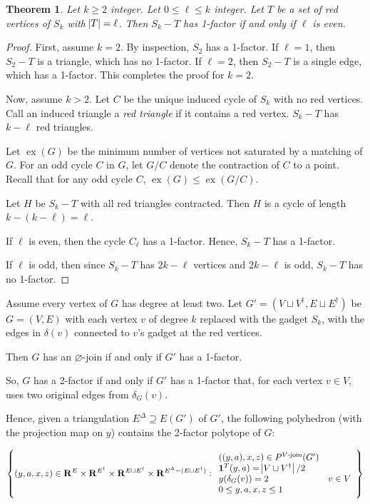 \documentclass{article}
\newtheorem{theorem}{Theorem}
\DeclareMathOperator{\ex}{ex}
\begin{document}
	\begin{theorem}
		Let $k\geq 2$ integer. Let $0\leq \ell \leq k$ integer.
		Let $T$ be a set of red vertices of $S_k$ with $\abs{T} =\ell$.
		Then $S_k - T$ has 1-factor if and only if $\ell$ is even.
	\end{theorem}

	\begin{proof}
		First, assume $k=2$. By inspection, $S_2$ has a 1-factor. If 
		$\ell=1$, then $S_2 - T$ is a triangle, which has no 1-factor.
		If $\ell=2$, then $S_2 - T$ is a single edge, which has a 1-factor.
		This completes the proof for $k=2$.

		Now, assume $k>2$. Let $C$ be the unique induced cycle of $S_k$
		with no red vertices. Call an induced triangle a \emph{red triangle}
		if it contains a red vertex. $S_k - T$ has $k-\ell$ red triangles.
		
		Let $\ex(G)$ be the minimum number of vertices not saturated
		by a matching of $G$.
		For an odd cycle $C$ in $G$, let $G/C$ denote the contraction of $C$
		to a point.  
		Recall that for any odd cycle $C$, $\ex(G) \leq \ex(G/C)$.

		Let $H$ be $S_k - T$ with all red triangles contracted.
		Then $H$ is a cycle of length $k - (k-\ell) = \ell$.

		If $\ell$ is even, then the cycle $C_\ell$ has a 1-factor.
		Hence, $S_k - T$ has a 1-factor. 

		If $\ell$ is odd, then since $S_k - T$ has $2k - \ell$ vertices
		and $2k-\ell$ is odd, $S_k - T$ has no 1-factor.
	\end{proof}


	Assume every vertex of $G$ has degree at least two.
	Let $G' = (V\sqcup V^\dagger, E\sqcup E^\dagger)$ be $G=(V,E)$
	with each vertex $v$ of degree $k$ replaced with the gadget $S_k$,
	with the edges in $\delta(v)$ connected to $v$'s gadget at the red vertices.


	Then $G$ has an $\varnothing$-join if and only if $G'$ has a 1-factor.
	
	So, $G$ has a 2-factor if and only if $G'$ has a 1-factor that,
	for each vertex $v\in V$,
	uses two original edges from $\delta_G(v)$.

	
	Hence, given a triangulation $E^\Delta\supseteq E(G')$ of $G'$,
	the following polyhedron (with the projection map
	on $y$) contains the 2-factor polytope  of $G$:

	$$\cbr{(y,a,x,z)\in \mathbf{R}^{E}\times\mathbf{R}^{E^\dagger} \times \mathbf{R}^{E \sqcup E^\dagger} \times \mathbf{R}^{E^\Delta - (E\sqcup E^\dagger)} : \begin{array}{ll}
		((y,a),x,z) \in P^{\text{$V$-join}}(G') \\
		\mathbf{1}^T(y,a) = \abs{V\sqcup V^\dagger} / 2 \\
		y(\delta_G(v)) = 2& v\in V \\
		0\leq y,a,x,z \leq 1
	\end{array}} $$
\end{document}
